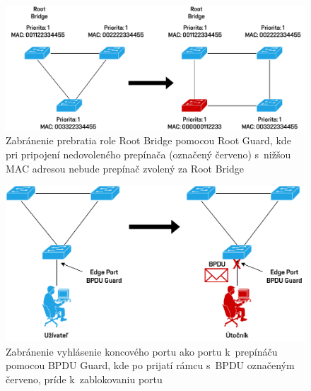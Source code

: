 \begin{figure}[H]
	\begin{center}
		\includegraphics[scale=0.75]{obrazky/root-guard.pdf}
	\end{center}
	\caption[Zabránenie prebratia role Root Bridge pomocou Root Guard]{Zabránenie prebratia role Root Bridge pomocou Root Guard, kde pri pripojení nedovoleného prepínača (označený červeno) s~nižšou MAC adresou nebude prepínač zvolený za Root Bridge}
	\label{fig:root-guard}
\end{figure} 

\begin{figure}[H]
	\begin{center}
		\includegraphics[scale=0.75]{obrazky/bpdu-guard.pdf}
	\end{center}
	\caption[Zabránenie vyhlásenie koncového portu ako portu k~prepínáču pomocou BPDU Guard]{Zabránenie vyhlásenie koncového portu ako portu k~prepínáču pomocou BPDU Guard, kde po prijatí rámcu s~BPDU označeným červeno, príde k~zablokovaniu portu}
	\label{fig:bpdu-guard}
\end{figure} 

